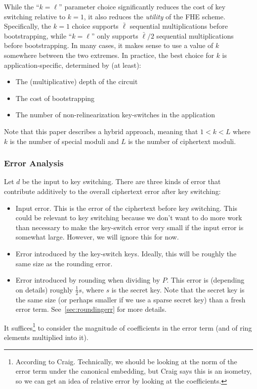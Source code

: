 \documentclass[../../fheimpl.tex]{subfiles}
\begin{document}
While the ``$k=\ell$'' parameter choice significantly reduces the cost of key switching relative to $k=1$, it also reduces the \emph{utility} of the FHE scheme. Specifically, the $k=1$ choice supports $\bar{\ell}$ sequential multiplications before bootstrapping, while ``$k=\ell$'' only supports $\bar{\ell}/2$ sequential multiplications before bootstrapping. In many cases, it makes sense to use a value of $k$ somewhere between the two extremes. In practice, the best choice for $k$ is application-specific, determined by (at least):
\begin{itemize}
	\item The (multiplicative) depth of the circuit
	\item The cost of bootstrapping
	\item The number of non-relinearization key-switches in the application
\end{itemize}


Note that this paper describes a hybrid approach, meaning that $1 < k < L$ where $k$ is the number of special moduli and $L$ is the number of ciphertext moduli.

\subsubsection{Error Analysis}
Let $d$ be the input to key switching. There are three kinds of error that contribute additively to the overall ciphertext error after key switching:
\begin{itemize}
	\item Input error. This is the error of the ciphertext before key switching. This could be relevant to key switching because we don't want to do more work than necessary to make the key-switch error very small if the input error is somewhat large. However, we will ignore this for now.
	\item Error introduced by the key-switch keys. Ideally, this will be roughly the same size as the rounding error.
	\item Error introduced by rounding when dividing by $P$. This error is (depending on details) roughly $\frac{1}{2}s$, where $s$ is the secret key. Note that the secret key is the same size (or perhaps smaller if we use a sparse secret key) than a fresh error term. See~\cref{sec:roundingerr} for more details.
\end{itemize}
It suffices\footnote{According to Craig. Technically, we should be looking at the norm of the error term under the canonical embedding, but Craig says this is an isometry, so we can get an idea of relative error by looking at the coefficients.} to consider the magnitude of coefficients in the error term (and of ring elements multiplied into it). 
\end{document}
